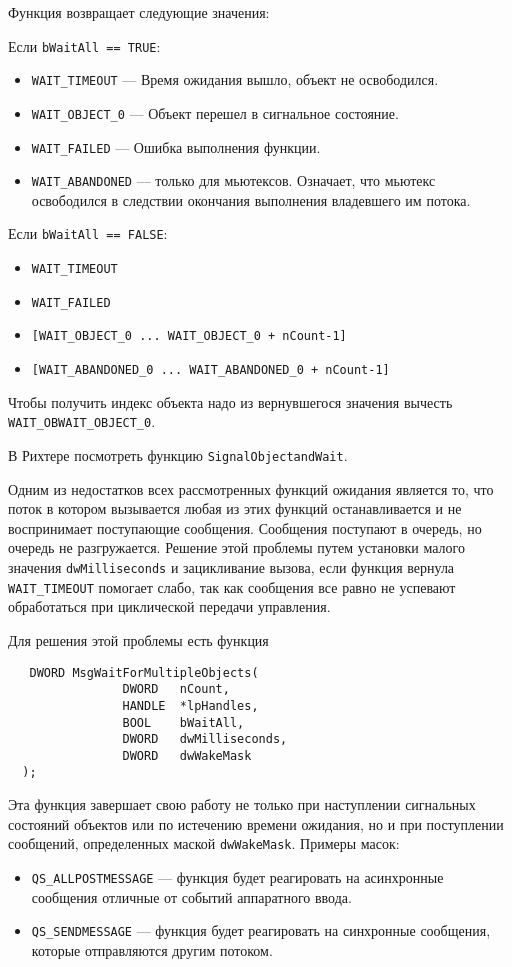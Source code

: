 Функция возвращает следующие значения:\par
Если \verb!bWaitAll == TRUE!:
\begin{itemize}
  \item \verb!WAIT_TIMEOUT! --- Время ожидания вышло, объект не освободился.
  \item \verb!WAIT_OBJECT_0! --- Объект перешел в сигнальное состояние.
  \item \verb!WAIT_FAILED! --- Ошибка выполнения функции.
  \item \verb!WAIT_ABANDONED! --- только для мьютексов. Означает, что мьютекс
    освободился в следствии окончания выполнения владевшего им потока.
\end{itemize}\par
Если \verb!bWaitAll == FALSE!:
\begin{itemize}
  \item \verb!WAIT_TIMEOUT!
  \item \verb!WAIT_FAILED!
  \item \verb![WAIT_OBJECT_0 ... WAIT_OBJECT_0 + nCount-1]!
  \item \verb![WAIT_ABANDONED_0 ... WAIT_ABANDONED_0 + nCount-1]!
\end{itemize}
Чтобы получить индекс объекта надо из вернувшегося значения вычесть
\verb!WAIT_OBWAIT_OBJECT_0!.

В Рихтере посмотреть функцию \verb!SignalObjectandWait!.

Одним из недостатков всех рассмотренных функций ожидания является то, что поток
в котором вызывается любая из этих функций останавливается и не воспринимает
поступающие сообщения. Сообщения поступают в очередь, но очередь не
разгружается. Решение этой проблемы путем установки малого значения
\verb!dwMilliseconds! и зацикливание вызова, если функция вернула
\verb!WAIT_TIMEOUT! помогает слабо, так как сообщения все равно не успевают
обработаться при циклической передачи управления.

Для решения этой проблемы есть функция 
\begin{verbatim}
   DWORD MsgWaitForMultipleObjects(
                DWORD   nCount,
                HANDLE  *lpHandles,
                BOOL    bWaitAll,
                DWORD   dwMilliseconds,
                DWORD   dwWakeMask
  );
\end{verbatim} 
Эта функция завершает свою работу не только при наступлении сигнальных состояний
объектов или по истечению времени ожидания, но и при поступлении сообщений,
определенных маской \verb!dwWakeMask!. Примеры масок:
\begin{itemize}
  \item \verb!QS_ALLPOSTMESSAGE! --- функция будет реагировать на асинхронные
    сообщения отличные от событий аппаратного ввода.
  \item \verb!QS_SENDMESSAGE! --- функция будет реагировать на синхронные
    сообщения, которые отправляются другим потоком.
\end{itemize}

